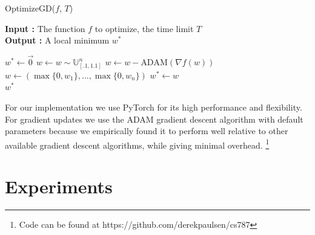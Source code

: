 \documentclass[a4paper]{article}
\begin{document}
\begin{algorithm}[H]
\caption{OptimizeGD($f$, $T$)}
\textbf{Input : } The function $f$ to optimize, the time limit $T$\\
\textbf{Output : } A local minimum $w^*$
\begin{algorithmic}[1]
	\State $w^* \gets \overrightarrow{0}$ 
		\State $w \gets w \sim \mathds{U}_{[.1,1.1]}^n$ 
				\State $w \gets w - \text{ADAM}(\nabla f(w))$ 
				\State $w \gets (\max\{0, w_1\},..., \max\{0, w_n\})$ 
			\EndFor
				\State $w^* \gets w$ 
			\EndIf
		\EndFor
	\EndWhile
	\\\Return $w^*$
\end{algorithmic}
\end{algorithm}

For our implementation we use PyTorch \cite{pytorch} for its high performance
and flexibility. For gradient updates we use the ADAM gradient descent algorithm with default parameters
\cite{ADAM_paper} because we empirically found it to perform well relative to
other available gradient descent algorithms, while giving minimal overhead. 
\footnote{Code can be found at https://github.com/derekpaulsen/cs787}

\section{Experiments}
\end{document}
